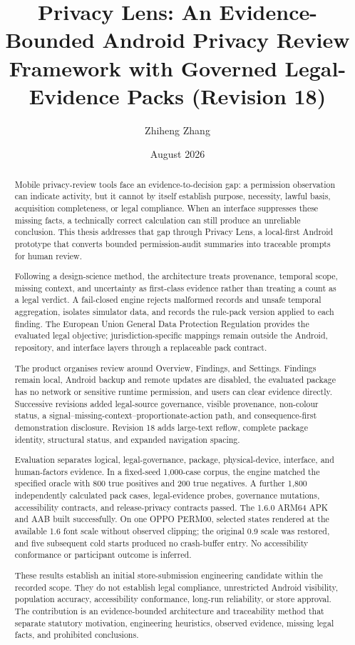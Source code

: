 \documentclass[11pt,a4paper]{article}
\title{Privacy Lens: An Evidence-Bounded Android Privacy Review Framework with Governed Legal-Evidence Packs (Revision 18)}
\author{Zhiheng Zhang}
\date{August 2026}
\begin{document}
\maketitle
\begin{abstract}
\small\singlespacing
Mobile privacy-review tools face an evidence-to-decision gap: a permission observation can indicate activity, but it cannot by itself establish purpose, necessity, lawful basis, acquisition completeness, or legal compliance. When an interface suppresses these missing facts, a technically correct calculation can still produce an unreliable conclusion. This thesis addresses that gap through Privacy Lens, a local-first Android prototype that converts bounded permission-audit summaries into traceable prompts for human review.

Following a design-science method, the architecture treats provenance, temporal scope, missing context, and uncertainty as first-class evidence rather than treating a count as a legal verdict. A fail-closed engine rejects malformed records and unsafe temporal aggregation, isolates simulator data, and records the rule-pack version applied to each finding. The European Union General Data Protection Regulation provides the evaluated legal objective; jurisdiction-specific mappings remain outside the Android, repository, and interface layers through a replaceable pack contract.

The product organises review around Overview, Findings, and Settings. Findings remain local, Android backup and remote updates are disabled, the evaluated package has no network or sensitive runtime permission, and users can clear evidence directly. Successive revisions added legal-source governance, visible provenance, non-colour status, a signal--missing-context--proportionate-action path, and consequence-first demonstration disclosure. Revision 18 adds large-text reflow, complete package identity, structural status, and expanded navigation spacing.

Evaluation separates logical, legal-governance, package, physical-device, interface, and human-factors evidence. In a fixed-seed 1,000-case corpus, the engine matched the specified oracle with 800 true positives and 200 true negatives. A further 1,800 independently calculated pack cases, legal-evidence probes, governance mutations, accessibility contracts, and release-privacy contracts passed. The 1.6.0 ARM64 APK and AAB built successfully. On one OPPO PERM00, selected states rendered at the available 1.6 font scale without observed clipping; the original 0.9 scale was restored, and five subsequent cold starts produced no crash-buffer entry. No accessibility conformance or participant outcome is inferred.

These results establish an initial store-submission engineering candidate within the recorded scope. They do not establish legal compliance, unrestricted Android visibility, population accuracy, accessibility conformance, long-run reliability, or store approval. The contribution is an evidence-bounded architecture and traceability method that separate statutory motivation, engineering heuristics, observed evidence, missing legal facts, and prohibited conclusions.
\end{abstract}
\end{document}
